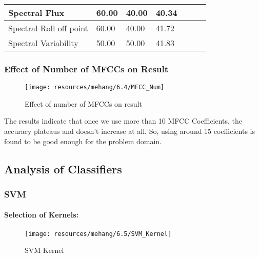 \begin{table}[h!]
\begin{center}
\begin{tabular}{|l|l|l|l|l|l|l|}
                        Spectral Flux
                        &
                        60.00
                        &
                        40.00
                        &
                        40.34
                        \\\hline

                        Spectral Roll off point
                        &
                        60.00
                        &
                        40.00
                        &
                        41.72
                        \\\hline

                        Spectral Variability
                        &
                        50.00
                        &
                        50.00
                        &
                        41.83
                        \\\hline

                 \end{tabular}
        \end{center}
\end{table}

\newpage
\newpage
\newpage
\subsubsection{Effect of Number of MFCCs on Result}
\begin{figure}[h!]
        \centering
        \texttt{[image: resources/mehang/6.4/MFCC\_Num]}
        \caption{Effect of number of MFCCs on result}
\end{figure}
The results indicate that once we use more than 10 MFCC Coefficients, the accuracy plateaus and doesn’t increase at all. So, using around 15 coefficients is found to be good enough for the problem domain.  

\newpage
\subsection{Analysis of Classifiers}
\subsubsection{SVM}
\paragraph{Selection of Kernels:}
\begin{figure}[h!]
        \centering
        \texttt{[image: resources/mehang/6.5/SVM\_Kernel]}
        \caption{SVM Kernel}
\end{figure}

